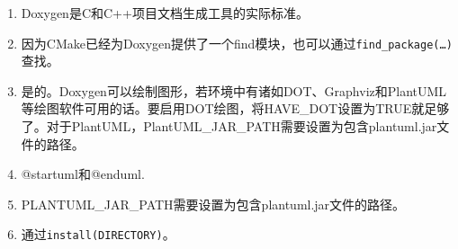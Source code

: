 

\begin{enumerate}
\item 
Doxygen是C和C++项目文档生成工具的实际标准。

\item
因为CMake已经为Doxygen提供了一个find模块，也可以通过\texttt{find\_package(…)}查找。

\item 
是的。Doxygen可以绘制图形，若环境中有诸如DOT、Graphviz和PlantUML等绘图软件可用的话。要启用DOT绘图，将HAVE\_DOT设置为TRUE就足够了。对于PlantUML，PlantUML\_JAR\_PATH需要设置为包含plantuml.jar文件的路径。

\item 
@startuml和@enduml.

\item 
PLANTUML\_JAR\_PATH需要设置为包含plantuml.jar文件的路径。

\item 
通过\texttt{install(DIRECTORY)}。
\end{enumerate}